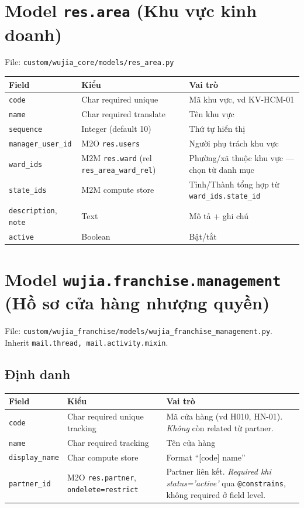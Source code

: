 \section{Model \texttt{res.area} (Khu vực kinh doanh)}

File: \texttt{custom/wujia\_core/models/res\_area.py}

\begin{longtable}{p{4cm} p{4cm} p{7cm}}
\toprule
\textbf{Field} & \textbf{Kiểu} & \textbf{Vai trò} \\
\midrule
\endhead
\texttt{code} & Char required unique & Mã khu vực, vd KV-HCM-01 \\
\texttt{name} & Char required translate & Tên khu vực \\
\texttt{sequence} & Integer (default 10) & Thứ tự hiển thị \\
\texttt{manager\_user\_id} & M2O \texttt{res.users} & Người phụ trách khu vực \\
\texttt{ward\_ids} & M2M \texttt{res.ward} (rel \texttt{res\_area\_ward\_rel}) & Phường/xã thuộc khu vực --- chọn từ danh mục \\
\texttt{state\_ids} & M2M compute store & Tỉnh/Thành tổng hợp từ \texttt{ward\_ids.state\_id} \\
\texttt{description}, \texttt{note} & Text & Mô tả + ghi chú \\
\texttt{active} & Boolean & Bật/tắt \\
\bottomrule
\end{longtable}

\section{Model \texttt{wujia.franchise.management} (Hồ sơ cửa hàng nhượng quyền)}

File: \texttt{custom/wujia\_franchise/models/wujia\_franchise\_management.py}. Inherit \texttt{mail.thread, mail.activity.mixin}.

\subsection{Định danh}

\begin{longtable}{p{5cm} p{4cm} p{6cm}}
\toprule
\textbf{Field} & \textbf{Kiểu} & \textbf{Vai trò} \\
\midrule
\endhead
\texttt{code} & Char required unique tracking & Mã cửa hàng (vd H010, HN-01). \emph{Không} còn related từ partner. \\
\texttt{name} & Char required tracking & Tên cửa hàng \\
\texttt{display\_name} & Char compute store & Format ``[code] name'' \\
\texttt{partner\_id} & M2O \texttt{res.partner}, \texttt{ondelete=restrict} & Partner liên kết. \emph{Required khi status='active'} qua \texttt{@constrains}, không required ở field level. \\
\bottomrule
\end{longtable}

